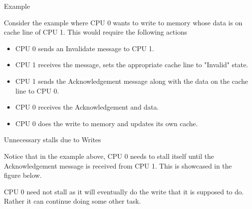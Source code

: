 \documentclass[notes, xcolor = dvipsnames]{beamer}
\begin{document}
    \begin{frame}{Example}

        Consider the example where CPU 0 wants to write to memory whose data is on cache line of CPU 1. 
        This would require the following actions
        \begin{itemize}
            \item CPU 0 sends an Invalidate message to CPU 1.
            \item CPU 1 receives the message, sets the appropriate cache line to "Invalid" state.
            \item CPU 1 sends the Acknowledgement message along with the data on the cache line to CPU 0.
            \item CPU 0 receives the Acknowledgement and data.
            \item CPU 0 does the write to memory and updates its own cache. 
        \end{itemize}

    \end{frame}

    \begin{frame}{Unnecessary stalls due to Writes}

        Notice that in the example above, CPU 0 needs to stall itself until the Acknowledgement message is received from CPU 1.
        This is showcased in the figure below.

        \begin{figure}
        \end{figure}

        CPU 0 need not stall as it will eventually do the write that it is supposed to do. 
        Rather it can continue doing some other task.

    \end{frame}
\end{document}
